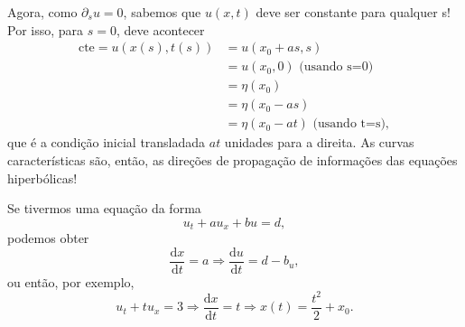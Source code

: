 \documentclass[../differential_methods.tex]{subfiles}
\begin{document}
Agora, como \(\partial_s u = 0\), sabemos que \(u(x, t)\) deve ser constante para qualquer s! Por isso, para \(s=0\), deve acontecer
\begin{align*}
	\mathrm{cte} = u(x(s), t(s)) & = u(x_{0}+as, s)                          \\
	                             & = u(x_{0}, 0)     \text{   (usando s=0)}  \\
	                             & = \eta (x_{0})                            \\
	                             & = \eta (x_{0}-as)                         \\
	                             & = \eta (x_{0}-at) \text{   (usando t=s)},
\end{align*}
que é a condição inicial transladada \(at\) unidades para a direita. As curvas características são, então, as direções de propagação de informações das equações hiperbólicas!

Se tivermos uma equação da forma
\[
	u_t + au_x + bu = d,
\]
podemos obter
\[
	\frac{\mathrm{d}x}{\mathrm{d}t} = a \Rightarrow \frac{\mathrm{d}u}{\mathrm{d}t} = d - b_u,
\]
ou então, por exemplo,
\[
	u_t + tu_x = 3 \Rightarrow \frac{\mathrm{d}x}{\mathrm{d}t} = t \Rightarrow  x(t)=\frac{t^{2}}{2}+x_{0}.
\]
\end{document}
